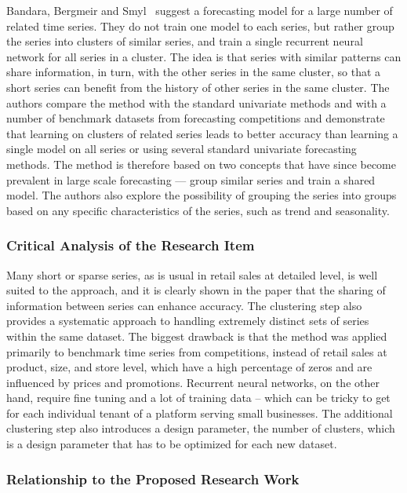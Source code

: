 \documentclass{StockSense}
\begin{document}
Bandara, Bergmeir and Smyl~\cite{bandara2020forecasting} suggest a forecasting model for a large number of related time series. They do not train one model to each series, but rather group the series into clusters of similar series, and train a single recurrent neural network for all series in a cluster. The idea is that series with similar patterns can share information, in turn, with the other series in the same cluster, so that a short series can benefit from the history of other series in the same cluster. The authors compare the method with the standard univariate methods and with a number of benchmark datasets from forecasting competitions and demonstrate that learning on clusters of related series leads to better accuracy than learning a single model on all series or using several standard univariate forecasting methods. The method is therefore based on two concepts that have since become prevalent in large scale forecasting --- group similar series and train a shared model. The authors also explore the possibility of grouping the series into groups based on any specific characteristics of the series, such as trend and seasonality.

\subsubsection{Critical Analysis of the Research Item}

Many short or sparse series, as is usual in retail sales at detailed level, is well suited to the approach, and it is clearly shown in the paper that the sharing of information between series can enhance accuracy. The clustering step also provides a systematic approach to handling extremely distinct sets of series within the same dataset. The biggest drawback is that the method was applied primarily to benchmark time series from competitions, instead of retail sales at product, size, and store level, which have a high percentage of zeros and are influenced by prices and promotions. Recurrent neural networks, on the other hand, require fine tuning and a lot of training data – which can be tricky to get for each individual tenant of a platform serving small businesses. The additional clustering step also introduces a design parameter, the number of clusters, which is a design parameter that has to be optimized for each new dataset.

\subsubsection{Relationship to the Proposed Research Work}
\end{document}
